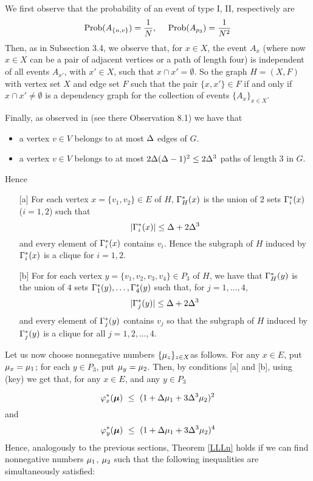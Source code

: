 \documentclass[11pt]{article}
\begin{document}
We first observe that  the probability
of an  event of type I, II,  respectively  are
$$
{\rm Prob}(A_{\{u,v\}})= {1\over N},~~~~
{\rm Prob}(A_{p_3})= {1\over N^2}
$$
Then, as in Subsection 3.4, we observe that, for $x\in X$, the event $A_x$ (where now $x\in X$ can be a pair of adjacent vertices or  a path of length four)
is independent of all events $A_{x'}$, with $x'\in X$, such that $x\cap x'=\emptyset$. So the graph $H=(X,F)$  with vertex
set $X$ and edge set $F$ such that
the pair $\{x,x'\}\in F$ if and only if  $x\cap x'\neq\emptyset$ is a dependency graph for the collection of events $\{A_x\}_{x\in X}$.





Finally, as observed in \cite{FRR} (see there Observation 8.1)  we have that

\begin{itemize}
\item
a vertex $v\in V$ belongs to at most $\Delta$ edges of $G$.
\item
a vertex $v\in V$ belongs to at most $2\Delta(\Delta-1)^2\le 2\Delta^3$  paths of length 3 in $G$.
\end{itemize}
Hence
\begin{itemize}
\item[{[a]}]
For each vertex  $x=\{v_1,v_2\}\in E$ of $H$,
$\Gamma_H^*(x)$ is the union of $2$ sets $\Gamma_i^*(x)$ ($i=1,2$)
such that
$$
|\Gamma_i^*(x)|\le  \Delta + 2\Delta^3
$$
and every element of $\Gamma_i^*(x)$ contains $v_i$.
Hence  the subgraph of $H$  induced by $\Gamma_i^*(x)$ is a clique for $i=1,2$.
\item[{[b]}]
For  for each  vertex $y= \{v_1,v_2,v_3,v_4\}\in P_3$ of $H$, we have that
$\Gamma_H^*(y)$ is the union of $4$ sets $\Gamma_1^*(y),\dots,\Gamma_{4}^*(y)$ such that,
for $j=1,\dots,  4$,
$$
|\Gamma_j^*(y)|\le \Delta + 2\Delta^3
$$
and every element of $\Gamma_{j}^*(y)$ contains $v_j$ so that the subgraph of $H$  induced by $\Gamma_j^*(y)$ is a clique
for all $j=1,2,\dots, 4$.
\end{itemize}
Let us now choose nonnegative  numbers $\{\mu_z\}_{z\in X}$as follows. For any $x\in E$, put $\mu_{x}=\mu_1$; for
each $y\in P_3$, put $\mu_y=\mu_2$.
Then, by    conditions [a] and [b], using \equ(key) we get that, for any $x\in E$, and any $y\in P_3$


$$
\varphi^{*}_{x}(\bm \mu)~\le~(1+ \Delta\mu_1 + 3\Delta^3\mu_2)^2
$$
and
$$
\varphi^{*}_{y}(\bm \mu)~\le~(1+ \Delta\mu_1 + 3\Delta^3\mu_2)^4
$$
Hence, analogously to the previous sections, Theorem \ref{LLLn} holds  if we can find
nonnegative  numbers $\mu_{1}$, $\mu_{2}$
such that the following inequalities are simultaneously satisfied:
\end{document}
